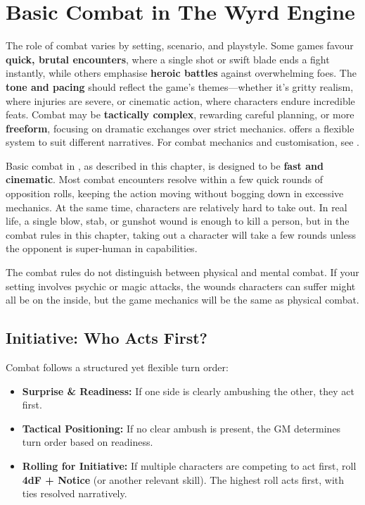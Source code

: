 \section{Basic Combat in The Wyrd Engine}

The role of combat varies by setting, scenario, and playstyle. Some games favour \textbf{quick, brutal encounters}, where a single shot or swift blade ends a fight instantly, while others emphasise \textbf{heroic battles} against overwhelming foes. The \textbf{tone and pacing} should reflect the game's themes—whether it’s gritty realism, where injuries are severe, or cinematic action, where characters endure incredible feats. Combat may be \textbf{tactically complex}, rewarding careful planning, or more \textbf{freeform}, focusing on dramatic exchanges over strict mechanics. \wyrd offers a flexible system to suit different narratives. For combat mechanics and customisation, see .

Basic combat in \wyrd, as described in this chapter, is designed to be \textbf{fast and cinematic}. Most combat encounters resolve within a few quick rounds of opposition rolls, keeping the action moving without bogging down in excessive mechanics. At the same time, characters are relatively hard to take out. In real life, a single blow, stab, or gunshot wound is enough to kill a person, but in the combat rules in this chapter, taking out a character will take a few rounds unless the opponent is super-human in capabilities.

The combat rules do not distinguish between physical and mental combat. If your setting involves psychic or magic attacks, the wounds characters can suffer might all be on the inside, but the game mechanics will be the same as physical combat.

\subsection{Initiative: Who Acts First?}

Combat follows a structured yet flexible turn order:

\begin{WyrdExplanation}
	\begin{itemize}
    	\item \textbf{Surprise \& Readiness:} If one side is clearly ambushing the other, they act first.
	    \item \textbf{Tactical Positioning:} If no clear ambush is present, the GM determines turn order based on readiness.
	    \item \textbf{Rolling for Initiative:} If multiple characters are competing to act first, roll \textbf{4dF + Notice} (or another relevant skill). The highest roll acts first, with ties resolved narratively.
	\end{itemize}
\end{WyrdExplanation}

